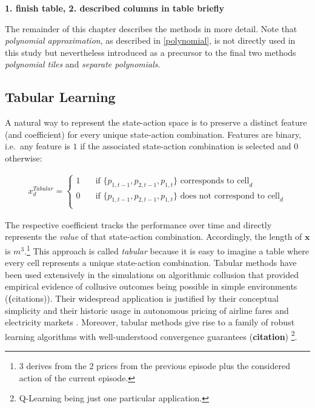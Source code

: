 \textbf{1. finish table, 2. described columns in table briefly}

The remainder of this chapter describes the methods in more detail. Note that \emph{polynomial approximation}, as described in \autoref{polynomial}, is not directly used in this study but nevertheless introduced as a precursor to the final two methods \emph{polynomial tiles} and \emph{separate polynomials}.


\subsection{Tabular Learning}\label{tabular}

A natural way to represent the state-action space is to preserve a distinct feature (and coefficient) for every unique state-action combination. Features are binary, i.e.\ any feature is  $1$ if the associated state-action combination is selected and $0$ otherwise:

\begin{gather}\label{cell_activation}
x_d^{Tabular} = \begin{cases}
1 & \quad \text{if } \{p_{1, t-1}, p_{2, t-1}, p_{1, t}\} \text{~corresponds to cell}_d  \\
0 & \quad \text{if } \{p_{1, t-1}, p_{2, t-1}, p_{1, t}\} \text{~does not correspond to cell}_d \\ \end{cases} 
\end{gather}

The respective coefficient tracks the performance over time and directly represents the \emph{value} of that state-action combination. Accordingly, the length of $\boldsymbol{x}$ is $m^3$.\footnote{$3$ derives from the 2 prices from the previous episode plus the considered action of the current episode.} This approach is called \emph{tabular} because it is easy to imagine a table where every cell represents a unique state-action combination. Tabular methods have been used extensively in the simulations on algorithmic collusion that provided empirical evidence of collusive outcomes being possible in simple environments (\textbf(citations)). Their widespread application is justified by their conceptual simplicity and their historic usage in autonomous pricing of airline fares and electricity markets \parencite{ittoo_algorithmic_2017}. Moreover, tabular methods give rise to a family of robust learning algorithms with well-understood convergence guarantees (\textbf{citation}) \footnote{Q-Learning being just one particular application.}.

